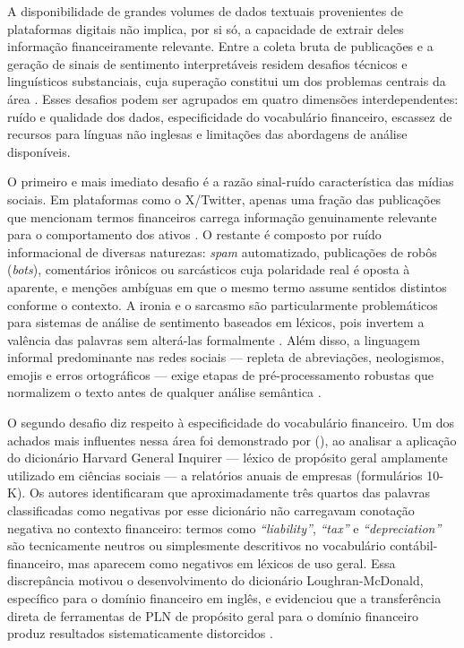 A disponibilidade de grandes volumes de dados textuais provenientes de plataformas digitais não implica, por si só, a capacidade de extrair deles informação financeiramente
relevante. Entre a coleta bruta de publicações e a geração de sinais de sentimento interpretáveis residem desafios técnicos e linguísticos substanciais, cuja superação constitui um dos problemas centrais da área \cite{kearney2014}. Esses desafios podem ser agrupados em quatro dimensões interdependentes: ruído e qualidade dos dados, especificidade do vocabulário financeiro, escassez de recursos para línguas não inglesas e limitações das abordagens de análise disponíveis.

O primeiro e mais imediato desafio é a razão sinal-ruído característica das mídias sociais. Em plataformas como o X/Twitter, apenas uma fração das publicações que mencionam termos financeiros carrega informação genuinamente relevante para o comportamento dos ativos \cite{bollen2011}. O restante é composto por ruído informacional de diversas naturezas: \textit{spam} automatizado, publicações de robôs (\textit{bots}), comentários irônicos ou sarcásticos cuja polaridade real é oposta à aparente, e menções ambíguas em que o mesmo termo assume sentidos distintos conforme o contexto. A ironia e o sarcasmo são particularmente problemáticos para sistemas de análise de sentimento baseados em léxicos, pois invertem a valência das palavras sem alterá-las formalmente \cite{liu2020survey}. Além disso, a linguagem informal predominante nas redes sociais --- repleta de abreviações, neologismos, emojis e erros ortográficos --- exige etapas de pré-processamento robustas que normalizem o texto antes de qualquer análise semântica \cite{sousa2025}.

O segundo desafio diz respeito à especificidade do vocabulário financeiro. Um dos achados mais influentes nessa área foi demonstrado por \citeauthor{loughran2011} (\citeyear{loughran2011}), ao analisar a aplicação do dicionário Harvard General Inquirer --- léxico de propósito geral amplamente utilizado em ciências sociais --- a relatórios anuais de empresas (formulários 10-K). Os autores identificaram que aproximadamente três quartos das palavras classificadas como negativas por esse dicionário não carregavam conotação negativa no contexto financeiro: termos como \textit{``liability''}, \textit{``tax''} e \textit{``depreciation''} são tecnicamente neutros ou simplesmente descritivos no vocabulário contábil-financeiro, mas aparecem como negativos em léxicos de uso geral. Essa discrepância motivou o desenvolvimento do dicionário Loughran-McDonald, específico para o domínio financeiro em inglês, e evidenciou que a transferência direta de ferramentas de PLN de propósito geral para o domínio financeiro produz resultados sistematicamente distorcidos \cite{loughran2011,kearney2014}.


